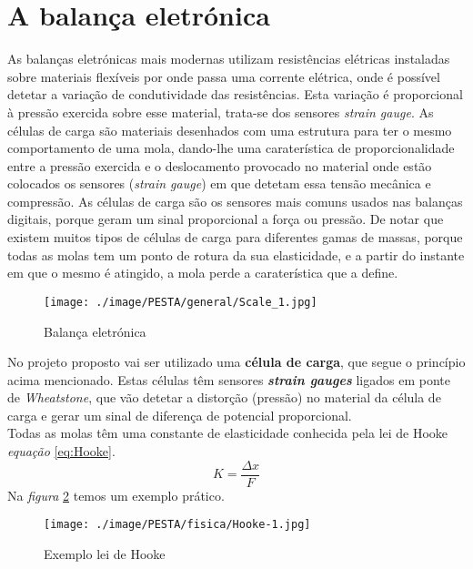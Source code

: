 \section{A balança eletrónica}
As balanças eletrónicas mais modernas utilizam resistências elétricas instaladas sobre materiais flexíveis por onde passa uma corrente elétrica, onde é possível detetar a variação de condutividade das resistências. Esta variação é proporcional à pressão exercida sobre esse material, trata-se dos sensores \textit{strain gauge}. As células de carga são materiais desenhados com uma estrutura para ter o mesmo comportamento de uma mola, dando-lhe uma caraterística de proporcionalidade entre a pressão exercida e o deslocamento provocado no material onde estão colocados os sensores (\textit{strain gauge}) em que detetam essa tensão mecânica e compressão. As células de carga são os sensores mais comuns usados nas balanças digitais, porque geram um sinal proporcional a força ou pressão. De notar que existem muitos tipos de células de carga para diferentes gamas de massas, porque todas as molas tem um ponto de rotura da sua elasticidade, e a partir do instante em que o mesmo é atingido, a mola perde a caraterística que a define.
\\
\begin{figure}[H]
	\centering
	\texttt{[image: ./image/PESTA/general/Scale\_1.jpg]}
	\caption{Balança eletrónica}
	\label{Scale_1}
\end{figure}
No projeto proposto vai ser utilizado uma \textbf{célula de carga}, que segue o princípio acima mencionado. Estas células têm sensores \textit{\textbf{strain gauges}} ligados em ponte de \textit{Wheatstone}, que vão detetar a distorção (pressão) no material da célula de carga e gerar um sinal de diferença de potencial proporcional. %
\\
Todas as molas têm uma constante de elasticidade conhecida pela lei de Hooke \cite{book-3} \textit{equação} \eqref{eq:Hooke}.\\
\begin{equation}
	\label{eq:Hooke}
	K = \frac{\Delta x}{F}
\end{equation}
Na \textit{figura} \ref{Hooke-1} temos um exemplo prático.
\begin{figure}[H]
	\centering
	\texttt{[image: ./image/PESTA/fisica/Hooke-1.jpg]}
	\caption{Exemplo lei de Hooke \cite{book-3}}
	\label{Hooke-1}
\end{figure}
